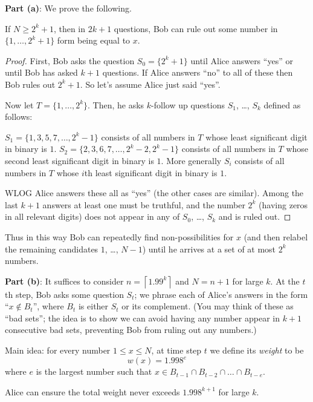 \textbf{Part (a)}: We prove the following.
\begin{claim*}
If $N \ge 2^k+1$, then in $2k+1$ questions,
Bob can rule out some number in $\{1, \dots, 2^k+1\}$
form being equal to $x$.
\end{claim*}
\begin{proof}
  First, Bob asks the question $S_0 = \{ 2^k+1 \}$
  until Alice answers ``yes''
  or until Bob has asked $k+1$ questions.
  If Alice answers ``no'' to all of these then Bob rules out $2^k+1$.
  So let's assume Alice just said ``yes''.

  Now let $T = \{1, \dots, 2^k\}$.
  Then, he asks $k$-follow up questions $S_1$, \dots, $S_k$
  defined as follows:
  \begin{itemize}
    \ii $S_1 = \{1, 3, 5, 7, \dots, 2^k-1\}$ consists of all numbers
    in $T$ whose least significant digit in binary is $1$.
    \ii $S_2 = \{ 2, 3, 6, 7, \dots, 2^k-2, 2^k-1\}$
    consists of all numbers in $T$ whose second least
    significant digit in binary is $1$.
    \ii More generally $S_i$
    consists of all numbers in $T$ whose $i$th least
    significant digit in binary is $1$.
  \end{itemize}
  WLOG Alice answers these all as ``yes'' (the other cases are similar).
  Among the last $k+1$ answers at least one must be truthful,
  and the number $2^k$ (having zeros in all relevant digits)
  does not appear in any of $S_0$, \dots, $S_k$ and is ruled out.
\end{proof}
Thus in this way Bob can repeatedly find non-possibilities for $x$
(and then relabel the remaining candidates $1$, \dots, $N-1$)
until he arrives at a set of at most $2^k$ numbers.

\textbf{Part (b)}:
It suffices to consider $n = \left\lceil 1.99^k \right\rceil$
and $N = n+1$ for large $k$.
At the $t$th step, Bob asks some question $S_t$;
we phrase each of Alice's answers in the form ``$x \notin B_t$'',
where $B_t$ is either $S_t$ or its complement.
(You may think of these as ``bad sets'';
the idea is to show we can avoid having any number
appear in $k+1$ consecutive bad sets,
preventing Bob from ruling out any numbers.)

Main idea: for every number $1 \le x \le N$,
at time step $t$ we define its \emph{weight}
to be \[ w(x) = 1.998^e \]
where $e$ is the largest number
such that $x \in B_{t-1} \cap B_{t-2} \cap \dots \cap B_{t-e}$.

\begin{claim*}
  Alice can ensure the total weight never exceeds $1.998^{k+1}$
  for large $k$.
\end{claim*}

